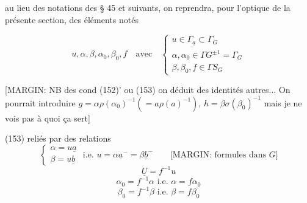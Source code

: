 \begin{enumerate}
au lieu des notations des § 45 et suivants, on reprendra, pour l'optique de la présente section, des éléments notés

$$ u, \alpha, \beta, \alpha_0, \beta_0, f \quad \text{avec} \quad \begin{cases} u \in \Gamma_{\underline{a}} \subset \Gamma_G \\ \alpha, \alpha_0 \in \Gamma G^{\pm 1} = \Gamma_G \\ \beta, \beta_0, f \in \Gamma S_G \end{cases} $$

[MARGIN: NB des cond (152)' ou (153) on déduit des identités autres... On pourrait introduire $g = \alpha \rho(\alpha_0)^{-1} (= a \rho(a)^{-1})$, $h = \beta \sigma(\beta_0)^{-1}$ mais je ne vois pas à quoi ça sert]

(153) reliés par des relations
$$ \begin{cases}
\alpha = u \underline{a} \\
\beta = u \underline{b}
\end{cases} \text{ i.e. } u = \alpha \underline{a}^{-} = \beta \underline{b}^{-} \qquad \text{[MARGIN: formules dans } G \text{]} $$
$$ \underline{U} = f^{-1} u $$
$$ \alpha_0 = f^{-1} \alpha \text{ i.e. } \alpha = f \alpha_0 $$
$$ \beta_0 = f^{-1} \beta \text{ i.e. } \beta = f \beta_0 $$

\newpage



\newpage



\newpage



\newpage



\newpage




\end{enumerate}
